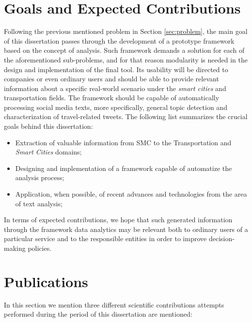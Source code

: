 \section{Goals and Expected Contributions}\label{sec:contributions}
Following the previous mentioned problem in Section \ref{sec:problem}, the main goal of this dissertation passes through the development of a prototype framework based on the concept of analysis. Such framework demands a solution for each of the aforementioned sub-problems, and for that reason modularity is needed in the design and implementation of the final tool. Its usability will be directed to companies or even ordinary users and should be able to provide relevant information about a specific real-world scenario under the \textit{smart cities} and transportation fields. The framework should be capable of automatically processing social media texts, more specifically, general topic detection and characterization of travel-related tweets. The following list summarizes the crucial goals behind this dissertation:

\begin{itemize}
	\item Extraction of valuable information from \gls{SMC} to the Transportation and \textit{Smart Cities} domains;
	\item Designing and implementation of a framework capable of automatize the analysis process;
	\item Application, when possible, of recent advances and technologies from the area of text analysis;
\end{itemize}

\medskip

In terms of expected contributions, we hope that such generated information through the framework data analytics may be relevant both to ordinary users of a particular service and to the responsible entities in order to improve decision-making policies.

\section{Publications}\label{sec:publications}
In this section we mention three different scientific contributions attempts performed during the period of this dissertation are mentioned:

